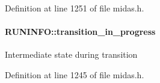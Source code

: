 Definition at line 1251 of file midas.h.
\paragraph[{transition\_\-in\_\-progress}]{ {\bf RUNINFO::transition\_\-in\_\-progress}}\hfill\label{structRUNINFO_a28c09956d19bc4404e81094841389ae3}
Intermediate state during transition 

Definition at line 1245 of file midas.h.